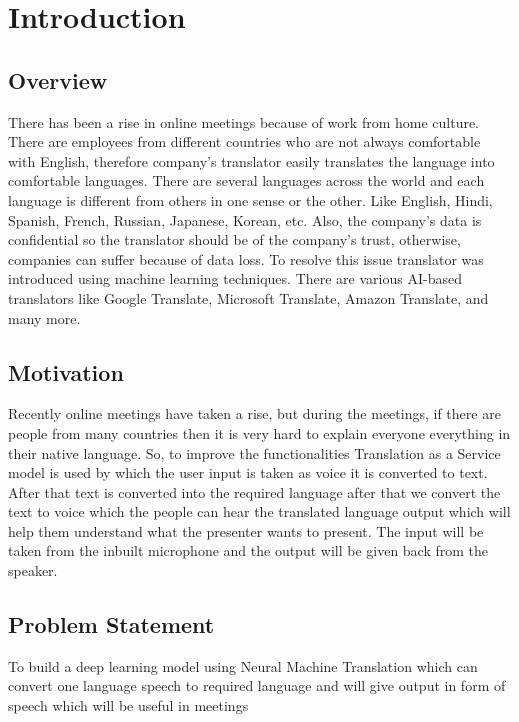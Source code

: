 \chapter{Introduction} 

\clearpage
\section{Overview}

There has been a rise in online meetings because of work from home culture. There are employees from different countries who are not always comfortable with English, therefore company’s translator easily translates the language into comfortable languages. There are several languages across the world and each language is different from others in one sense or the other. Like English, Hindi, Spanish, French, Russian, Japanese, Korean, etc. Also, the company’s data is confidential so the translator should be of the company’s trust, otherwise, companies can suffer because of data loss.
To resolve this issue translator was introduced using machine learning techniques. There are various AI-based translators like Google Translate, Microsoft Translate, Amazon Translate, and many more. 
 \newpage

\section{Motivation} 
Recently online meetings have taken a rise, but during the meetings, if there are people from many countries then it is very hard to explain everyone everything in their native language. So, to improve the functionalities Translation as a Service model is used by which the user input is taken as voice it is converted to text. After that text is converted into the required language after that we convert the text to voice which the people can hear the translated language output which will help them understand what the presenter wants to present. The input will be taken from the inbuilt microphone and the output will be given back from the speaker.
\\
\section{Problem Statement}
To build a deep learning model using Neural Machine Translation which can convert one language speech to required language and will give output in form of speech which will be useful in meetings 

\newpage

